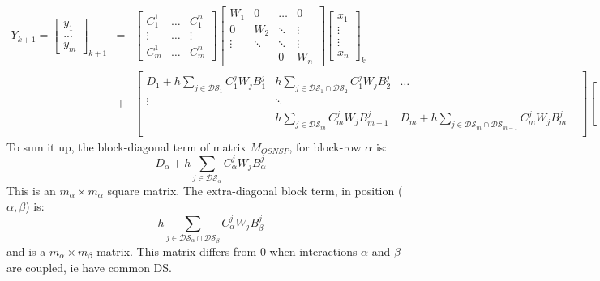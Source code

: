 \documentclass[10pt]{report}
\begin{document}
\begin{eqnarray}
Y_{k+1} =\left[\begin{array}{c} 
y_1 \\
...  \\
y_m
\end{array}\right]_{k+1}
&=&\left[\begin{array}{ccc} 
C_1^1 & \ldots & C_1^n \\
\vdots & \ldots & \vdots \\
C_m^1 & \ldots & C_m^n 
\end{array}\right]\left[\begin{array}{cccc} 
W_1 & 0 & \ldots &0 \\
0  & W_2 & \ddots & \vdots \\
\vdots &\ddots  & \ddots & \vdots \\
&&0& W_n
\end{array}\right]
\left[\begin{array}{c} 
x_1  \\
\vdots \\
\vdots \\
x_n 
\end{array}\right]_k \\
&+&\left[\begin{array}{cccc} 
D_1+h\sum_{j\in \mathcal{DS}_1}C_1^jW_jB_1^j & h\displaystyle{\sum_{j\in \mathcal{DS}_1\cap\mathcal{DS}_2}C_1^jW_jB_2^j} & \ldots &\\
\vdots&\ddots& &\\
& h\displaystyle{\sum_{j\in \mathcal{DS}_m}C_m^jW_jB_{m-1}^j}  & D_m+h\displaystyle{\sum_{j\in \mathcal{DS}_m\cap\mathcal{DS}_{m-1}}C_m^jW_jB_m^j} \\
\end{array}\right]\left[\begin{array}{c} 
\lambda_1  \\
\vdots \\
\lambda_m 
\end{array}\right]_{k+1} \nonumber
\end{eqnarray}
To sum it up, the block-diagonal term of matrix $M_{OSNSP}$, for block-row $\alpha$ is:
\begin{equation}
D_{\alpha}+h\sum_{j\in \mathcal{DS}_{\alpha}}C_{\alpha}^jW_jB_{\alpha}^j
\end{equation}
This is an $m_{\alpha}\times m_{\alpha}$ square matrix.
The extra-diagonal block term, in position ($\alpha,\beta$) is: 
\begin{equation}
h\sum_{j\in \mathcal{DS}_{\alpha}\cap\mathcal{DS}_{\beta}}C_{\alpha}^jW_jB_{\beta}^j
\end{equation}
and is a $m_{\alpha}\times m_{\beta}$ matrix. This matrix differs from 0 when interactions $\alpha$ and $\beta$ are coupled, ie have common DS. \\
\end{document}
